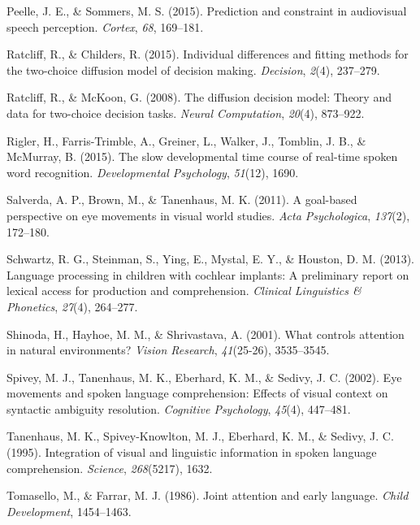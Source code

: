 \documentclass[english,floatsintext,man]{apa6}
\begin{document}
\leavevmode\hypertarget{ref-peelle2015prediction}{}%
Peelle, J. E., \& Sommers, M. S. (2015). Prediction and constraint in
audiovisual speech perception. \emph{Cortex}, \emph{68}, 169--181.

\leavevmode\hypertarget{ref-ratcliff2015individual}{}%
Ratcliff, R., \& Childers, R. (2015). Individual differences and fitting
methods for the two-choice diffusion model of decision making.
\emph{Decision}, \emph{2}(4), 237--279.

\leavevmode\hypertarget{ref-ratcliff2008diffusion}{}%
Ratcliff, R., \& McKoon, G. (2008). The diffusion decision model: Theory
and data for two-choice decision tasks. \emph{Neural Computation},
\emph{20}(4), 873--922.

\leavevmode\hypertarget{ref-rigler2015slow}{}%
Rigler, H., Farris-Trimble, A., Greiner, L., Walker, J., Tomblin, J. B.,
\& McMurray, B. (2015). The slow developmental time course of real-time
spoken word recognition. \emph{Developmental Psychology}, \emph{51}(12),
1690.

\leavevmode\hypertarget{ref-salverda2011goal}{}%
Salverda, A. P., Brown, M., \& Tanenhaus, M. K. (2011). A goal-based
perspective on eye movements in visual world studies. \emph{Acta
Psychologica}, \emph{137}(2), 172--180.

\leavevmode\hypertarget{ref-schwartz2013language}{}%
Schwartz, R. G., Steinman, S., Ying, E., Mystal, E. Y., \& Houston, D.
M. (2013). Language processing in children with cochlear implants: A
preliminary report on lexical access for production and comprehension.
\emph{Clinical Linguistics \& Phonetics}, \emph{27}(4), 264--277.

\leavevmode\hypertarget{ref-shinoda2001controls}{}%
Shinoda, H., Hayhoe, M. M., \& Shrivastava, A. (2001). What controls
attention in natural environments? \emph{Vision Research},
\emph{41}(25-26), 3535--3545.

\leavevmode\hypertarget{ref-spivey2002eye}{}%
Spivey, M. J., Tanenhaus, M. K., Eberhard, K. M., \& Sedivy, J. C.
(2002). Eye movements and spoken language comprehension: Effects of
visual context on syntactic ambiguity resolution. \emph{Cognitive
Psychology}, \emph{45}(4), 447--481.

\leavevmode\hypertarget{ref-tanenhaus1995integration}{}%
Tanenhaus, M. K., Spivey-Knowlton, M. J., Eberhard, K. M., \& Sedivy, J.
C. (1995). Integration of visual and linguistic information in spoken
language comprehension. \emph{Science}, \emph{268}(5217), 1632.

\leavevmode\hypertarget{ref-tomasello1986joint}{}%
Tomasello, M., \& Farrar, M. J. (1986). Joint attention and early
language. \emph{Child Development}, 1454--1463.
\end{document}
